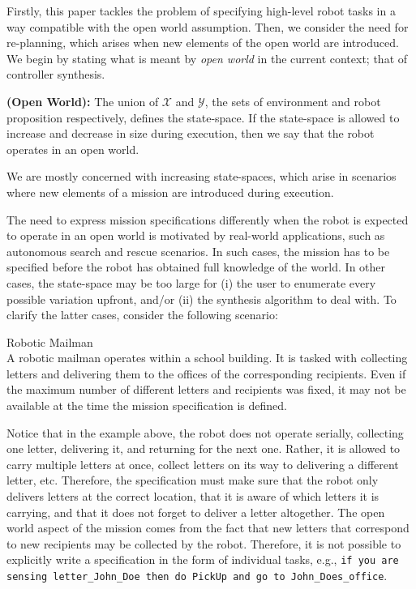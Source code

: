 Firstly, this paper tackles the problem of specifying high-level robot tasks in a way compatible with the open world assumption. Then, we consider the need for re-planning, which arises when new elements of the open world are introduced. We begin by stating what is meant by \emph{open world} in the current context; that of controller synthesis.

\begin{myDefinition}
	\textbf{(Open World):} The union of $\mathcal{X}$ and $\mathcal{Y}$, the sets of environment and robot proposition respectively, defines the state-space. If the state-space is allowed to increase and decrease in size during execution, then we say that the robot operates in an open world.
\end{myDefinition}
We are mostly concerned with increasing state-spaces, which arise in scenarios where new elements of a mission are introduced during execution.

The need to express mission specifications differently when the robot is expected to operate in an open world is motivated by real-world applications, such as autonomous search and rescue scenarios. In such cases, the mission has to be specified before the robot has obtained full knowledge of the world. In other cases, the state-space may be too large for (i) the user to enumerate every possible variation upfront, and/or (ii) the synthesis algorithm to deal with. To clarify the latter cases, consider the following scenario:

\begin{myExample}\label{Ex:mailman1} Robotic Mailman\\
	A robotic mailman operates within a school building. It is tasked with collecting letters and delivering them to the offices of the corresponding recipients. Even if the maximum number of different letters and recipients was fixed, it may not be available at the time the mission specification is defined. 
\end{myExample}

Notice that in the example above, the robot does not operate serially, collecting one letter, delivering it, and returning for the next one. Rather, it is allowed to carry multiple letters at once, collect letters on its way to delivering a different letter, etc. Therefore, the specification must make sure that the robot only delivers letters at the correct location, that it is aware of which letters it is carrying, and that it does not forget to deliver a letter altogether. The open world aspect of the mission comes from the fact that new letters that correspond to new recipients may be collected by the robot. Therefore, it is not possible to explicitly write a specification in the form of individual tasks, e.g., \texttt{if you are sensing letter\_John\_Doe then do PickUp and go to John\_Does\_office}.

